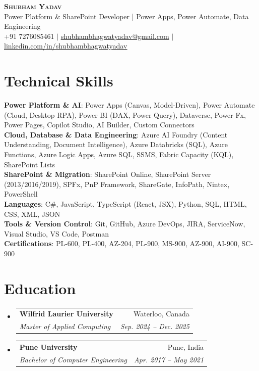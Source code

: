 \documentclass[letterpaper,11pt]{article}
\makeatletter
\newcommand{\resumeSubheading}[4]{
  \vspace{-2pt}\item
    \begin{tabular*}{0.97\textwidth}[t]{l@{\extracolsep{\fill}}r}
      \textbf{#1} & #2 \\
      \textit{\small#3} & \textit{\small #4} \\
    \end{tabular*}\vspace{-7pt}
}
\newcommand{\resumeSubHeadingListStart}{\begin{itemize}[leftmargin=0.15in, label={}]}
\newcommand{\resumeSubHeadingListEnd}{\end{itemize}}
\makeatother
\begin{document}
\begin{center}
    \textbf{\Huge \scshape Shubham Yadav} \\ \vspace{2pt}
    \small Power Platform \& SharePoint Developer | Power Apps, Power Automate, Data Engineering \\ \vspace{2pt}
    \small +91 7276085461 $|$ \href{mailto:shubhambhagwatyadav@gmail.com}{\underline{shubhambhagwatyadav@gmail.com}} $|$
    \href{https://linkedin.com/in/shubhambhagwatyadav}{\underline{linkedin.com/in/shubhambhagwatyadav}}
\end{center}

\section{Technical Skills}
 \begin{itemize}[leftmargin=0.15in, label={}]
    \small{\item{
     \textbf{Power Platform \& AI}{: Power Apps (Canvas, Model-Driven), Power Automate (Cloud, Desktop RPA), Power BI (DAX, Power Query), Dataverse, Power Fx, Power Pages, Copilot Studio, AI Builder, Custom Connectors} \\
     \textbf{Cloud, Database \& Data Engineering}{: Azure AI Foundry (Content Understanding, Document Intelligence), Azure Databricks (SQL), Azure Functions, Azure Logic Apps, Azure SQL, SSMS, Fabric Capacity (KQL), SharePoint Lists} \\
     \textbf{SharePoint \& Migration}{: SharePoint Online, SharePoint Server (2013/2016/2019), SPFx, PnP Framework, ShareGate, InfoPath, Nintex, PowerShell} \\
     \textbf{Languages}{: C\#, JavaScript, TypeScript (React, JSX), Python, SQL, HTML, CSS, XML, JSON} \\
     \textbf{Tools \& Version Control}{: Git, GitHub, Azure DevOps, JIRA, ServiceNow, Visual Studio, VS Code, Postman} \\
     \textbf{Certifications}{: PL-600, PL-400, AZ-204, PL-900, MS-900, AZ-900, AI-900, SC-900}
    }}
 \end{itemize}

\section{Education}
  \resumeSubHeadingListStart
    \resumeSubheading
      {Wilfrid Laurier University}{Waterloo, Canada}
      {Master of Applied Computing}{Sep. 2024 – Dec. 2025}
    \resumeSubheading
      {Pune University}{Pune, India}
      {Bachelor of Computer Engineering}{Apr. 2017 – May 2021}
  \resumeSubHeadingListEnd
\end{document}
